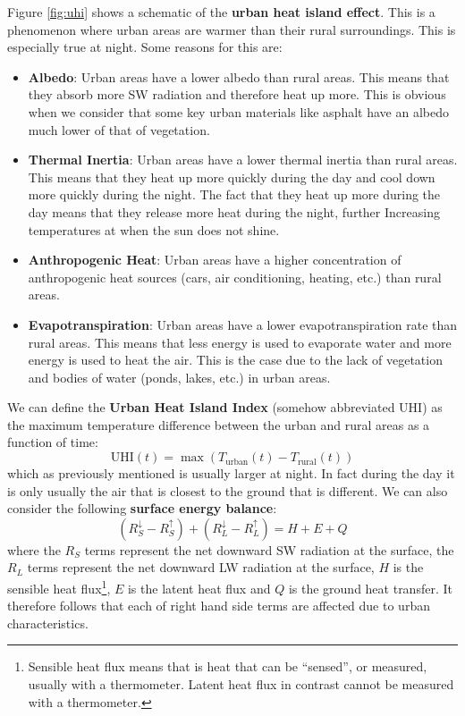 Figure \ref{fig:uhi} shows a schematic of the \textbf{urban heat island effect}.
This is a phenomenon where urban areas are warmer than their rural surroundings.
This is especially true at night. Some reasons for this are:
\begin{itemize}
    \item \textbf{Albedo}: Urban areas have a lower albedo than rural areas. 
    This means that they absorb more \gls{SW} radiation and therefore heat up 
    more. This is obvious when we consider that some key urban materials like 
    asphalt have an albedo much lower of that of vegetation.
    \item \textbf{Thermal Inertia}: Urban areas have a lower thermal inertia than
    rural areas. This means that they heat up more quickly during the day and cool
    down more quickly during the night. The fact that they heat up more during
    the day means that they release more heat during the night, further Increasing
    temperatures at when the sun does not shine.
    \item \textbf{Anthropogenic Heat}: Urban areas have a higher concentration of
    anthropogenic heat sources (cars, air conditioning, heating, etc.) than rural areas.
    \item \textbf{Evapotranspiration}: Urban areas have a lower evapotranspiration
    rate than rural areas. This means that less energy is used to evaporate water
    and more energy is used to heat the air. This is the case due to the lack of
    vegetation and bodies of water (ponds, lakes, etc.) in urban areas.
\end{itemize}

We can define the \textbf{Urban Heat Island Index} (somehow abbreviated UHI) as
the maximum temperature difference between the urban and rural areas as a function
of time:
$$
\boxed{
\text{UHI}(t) = \max(T_{\text{urban}}(t) - T_{\text{rural}}(t))
}
$$
which as previously mentioned is usually larger at night. In fact during the day
it is only usually the air that is closest to the ground that is different. We 
can also consider the following \textbf{surface energy balance}:
$$
(R_S^{\downarrow} - R_S^{\uparrow}) + (R_L^{\downarrow} - R_L^{\uparrow}) = H + E + Q
$$
where the $R_S$ terms represent the net downward \gls{SW} radiation at the surface,
the $R_L$ terms represent the net downward \gls{LW} radiation at the surface, $H$
is the sensible heat flux\footnote{Sensible heat flux means that is heat that can be ``sensed'',
or measured, usually with a thermometer. Latent heat flux in contrast cannot be
measured with a thermometer.}, $E$ is the latent heat flux and $Q$ is the ground heat 
transfer. It therefore follows that each of right hand side terms are affected 
due to urban characteristics.\\

